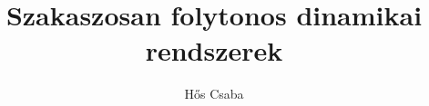 \documentclass[11pt]{report}
\title{Szakaszosan folytonos dinamikai rendszerek}
\author{Hős Csaba}
\begin{document}
\maketitle			
\pagebreak
\tableofcontents
\clearpage
\pagebreak







\end{document}
